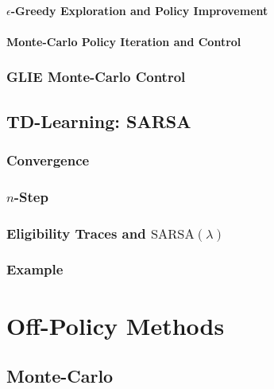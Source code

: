 				\paragraph{\(\epsilon\)-Greedy Exploration and Policy Improvement} %

				\paragraph{Monte-Carlo Policy Iteration and Control} %

			\subsubsection{GLIE Monte-Carlo Control} %

		\subsection{TD-Learning: SARSA} %

			\subsubsection{Convergence} %

			\subsubsection{\(n\)-Step} %

			\subsubsection{Eligibility Traces and \( \text{SARSA}(\lambda) \)} %

			\subsubsection{Example} %

	\section{Off-Policy Methods} %

		\subsection{Monte-Carlo} %

